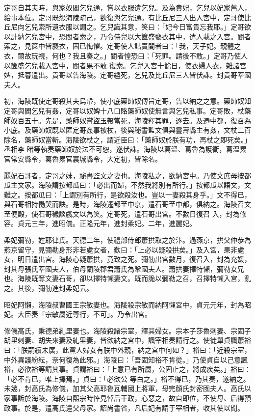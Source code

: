 \begin{pinyinscope}
 定哥自其夫時，與家奴閻乞兒通，嘗以衣服遺乞兒。及為貴妃，乞兒以妃家舊人，給事本位。定哥既怨海陵疏己，欲復與乞兒通。有比丘尼三人出入宮中，定哥使比丘尼向乞兒索所遺衣服以調之。乞兒識其意，笑曰：「妃今日富貴忘我耶。」定哥欲以計納乞兒宮中，恐閽者索之，乃令侍兒以大篋盛褻衣其中，遣人載之入宮。閽者索之，見篋中皆褻衣，固已悔懼。定哥使人詰責閽者曰：「我，天子妃。親體之衣，爾故玩視，何也？我且奏之。」閽者惶恐曰：「死罪。請後不敢。」定哥乃使人以篋盛乞兒載入宮中，閽者果不敢
 復索。乞兒入宮十餘日，使衣婦人衣，雜諸宮婢，抵暮遣出。貴哥以告海陵。定哥縊死，乞兒及比丘尼三人皆伏誅。封貴哥莘國夫人。



 初，海陵既使定哥殺其夫烏帶，使小底藥師奴傳旨定哥，告以納之之意。藥師奴知定哥與閻乞兒有姦，定哥以奴婢十八口賂藥師奴使無言與乞兒私事。定哥敗，杖藥師奴百五十。先是，藥師奴嘗盜玉帶當死，海陵釋其罪，逐去。及遷中都，復召為小底。及藥師奴既以匿定哥姦事被杖，後與秘書監文俱與靈壽縣主有姦，文杖二百除名，藥師奴當斬。海陵欲杖之，謂近臣曰：「藥師奴於朕有功，再杖之即死矣。」丞相李
 睹等執奏藥師奴於法不可恕，遂伏誅。海陵以葛溫、葛魯為護衛，葛溫累官常安縣令，葛魯累官襄城縣令，大定初，皆除名。



 麗妃石哥者，定哥之妹，祕書監文之妻也。海陵私之，欲納宮中。乃使文庶母按都瓜主文家。海陵謂按都瓜曰：「必出而婦，不然我將別有所行。」按都瓜以語文，文難之。按都瓜曰：「上謂別有所行，是欲殺汝也。豈以一妻殺其身乎。」文不得已，與石哥相持慟哭而訣。是時，海陵遷都至中京，遣石哥至中都，俱納之。海陵召文至便殿，使石哥穢談戲文以為笑。定哥死，遣石哥出宮。不數日復召
 入，封為修容。貞元三年，進昭儀。正隆元年，進封柔妃。二年，進麗妃。



 柔妃彌勒，姓耶律氏。天德二年，使禮部侍郎蕭拱取之於汴。過燕京，拱父仲恭為燕京留守，見彌勒身形非若處女者，歎曰：「上必以疑殺拱矣。」及入宮，果非處女，明日遣出宮。海陵心疑蕭拱，竟致之死。彌勒出宮數月，復召入，封為充媛，封其母張氏莘國夫人，伯母蘭陵郡君蕭氏為鞏國夫人。蕭拱妻擇特懶，彌勒女兄也。海陵既奪文妻石哥，卻以擇特懶妻文。既而詭以彌勒之召，召擇特懶入宮，亂之。其後，彌勒進封柔妃云。



 昭妃阿懶，海陵叔曹國王宗敏妻也。海陵殺宗敏而納阿懶宮中，貞元元年，封為昭妃。大臣奏「宗敏屬近尊行，不可」。乃令出宮。



 修儀高氏，秉德弟糺里妻也。海陵殺諸宗室，釋其婦女。宗本子莎魯刺妻、宗固子胡里刺妻、胡失來妻及糺里妻，皆欲納之宮中，諷宰相奏請行之。使徒單貞諷蕭裕曰：「朕嗣續未廣，此黨人婦女有朕中外親，納之宮中何如？」裕曰：「近殺宗室，中外異議紛紜，奈何復為此邪。」海陵曰：「吾固知裕不肯從。」乃使貞自以己意諷裕，必欲裕等請其事。貞謂裕曰：「上意已有所屬，公固止之，將成疾矣。」裕曰：「必不肯已，唯上擇焉。」貞曰：「必欲公
 等白之。」裕不得已，乃其奏，遂納之。未幾，封高氏為修儀，加其父高耶魯瓦輔國上將軍，母完顏氏封密國夫人。高氏以家事訴於海陵。海陵自熙宗時悻見悼后干政，心惡之，故自即位，不使母、后得預政事。於是，遣高氏還父母家。詔尚書省，凡后妃有請于宰相者，收其使以聞。




\end{pinyinscope}
